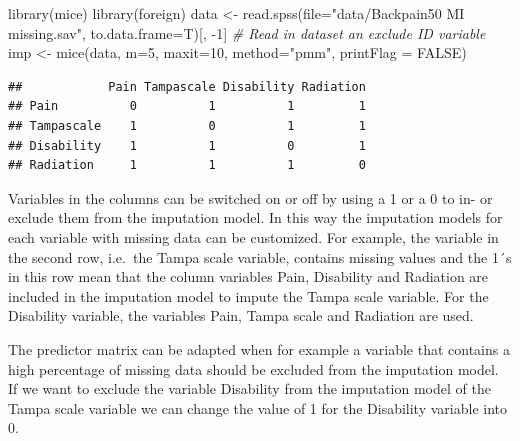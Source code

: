 \documentclass[
]{book}
\newenvironment{Shaded}{\begin{snugshade}}{\end{snugshade}}
\newcommand{\AttributeTok}[1]{\textcolor[rgb]{0.77,0.63,0.00}{#1}}
\newcommand{\CommentTok}[1]{\textcolor[rgb]{0.56,0.35,0.01}{\textit{#1}}}
\newcommand{\ConstantTok}[1]{\textcolor[rgb]{0.00,0.00,0.00}{#1}}
\newcommand{\DecValTok}[1]{\textcolor[rgb]{0.00,0.00,0.81}{#1}}
\newcommand{\FunctionTok}[1]{\textcolor[rgb]{0.00,0.00,0.00}{#1}}
\newcommand{\NormalTok}[1]{#1}
\newcommand{\OtherTok}[1]{\textcolor[rgb]{0.56,0.35,0.01}{#1}}
\newcommand{\SpecialCharTok}[1]{\textcolor[rgb]{0.00,0.00,0.00}{#1}}
\newcommand{\StringTok}[1]{\textcolor[rgb]{0.31,0.60,0.02}{#1}}
\begin{document}
\begin{Shaded}
\begin{Highlighting}[]
\FunctionTok{library}\NormalTok{(mice)}
\FunctionTok{library}\NormalTok{(foreign)}
\NormalTok{data }\OtherTok{\textless{}{-}} \FunctionTok{read.spss}\NormalTok{(}\AttributeTok{file=}\StringTok{"data/Backpain50 MI missing.sav"}\NormalTok{, }\AttributeTok{to.data.frame=}\NormalTok{T)[, }\SpecialCharTok{{-}}\DecValTok{1}\NormalTok{] }\CommentTok{\# Read in dataset an exclude ID variable}
\NormalTok{imp }\OtherTok{\textless{}{-}} \FunctionTok{mice}\NormalTok{(data, }\AttributeTok{m=}\DecValTok{5}\NormalTok{, }\AttributeTok{maxit=}\DecValTok{10}\NormalTok{, }\AttributeTok{method=}\StringTok{"pmm"}\NormalTok{, }\AttributeTok{printFlag =} \ConstantTok{FALSE}\NormalTok{)}
\end{Highlighting}
\end{Shaded}

\begin{Shaded}
\end{Shaded}

\begin{verbatim}
##            Pain Tampascale Disability Radiation
## Pain          0          1          1         1
## Tampascale    1          0          1         1
## Disability    1          1          0         1
## Radiation     1          1          1         0
\end{verbatim}

Variables in the columns can be switched on or off by using a 1 or a 0 to in- or exclude them from the imputation model. In this way the imputation models for each variable with missing data can be customized. For example, the variable in the second row, i.e.~the Tampa scale variable, contains missing values and the 1´s in this row mean that the column variables Pain, Disability and Radiation are included in the imputation model to impute the Tampa scale variable. For the Disability variable, the variables Pain, Tampa scale and Radiation are used.

The predictor matrix can be adapted when for example a variable that contains a high percentage of missing data should be excluded from the imputation model. If we want to exclude the variable Disability from the imputation model of the Tampa scale variable we can change the value of 1 for the Disability variable into 0.
\end{document}
